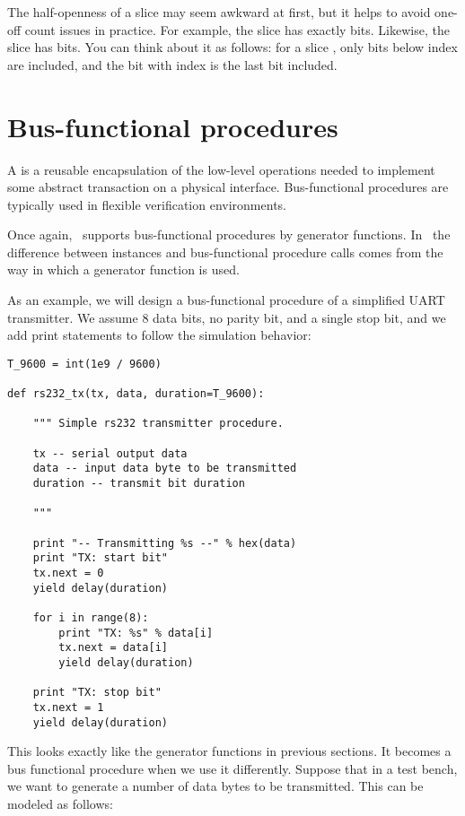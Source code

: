 The half-openness of a slice may seem awkward at first, but it helps
to avoid one-off count issues in practice. For example, the slice
 has exactly  bits. Likewise, the slice
 has  bits. You can think about it as
follows: for a slice \code{[i:j]}, only bits below index  are
included, and the bit with index  is the last bit included.


\section{Bus-functional procedures}

A  is a reusable encapsulation of the
low-level operations needed to implement some abstract transaction on
a physical interface. Bus-functional procedures are typically used in
flexible verification environments.

Once again, \myhdl\ supports bus-functional procedures by generator
functions. In \myhdl\, the difference between instances and
bus-functional procedure calls comes from the way in which a generator
function is used.

As an example, we will design a bus-functional procedure of a
simplified UART transmitter. We assume 8 data bits, no parity bit, and
a single stop bit, and we add print statements to follow the
simulation behavior:

\begin{verbatim}
T_9600 = int(1e9 / 9600)

def rs232_tx(tx, data, duration=T_9600):
    
    """ Simple rs232 transmitter procedure.

    tx -- serial output data
    data -- input data byte to be transmitted
    duration -- transmit bit duration
    
    """

    print "-- Transmitting %s --" % hex(data)
    print "TX: start bit"      
    tx.next = 0
    yield delay(duration)

    for i in range(8):
        print "TX: %s" % data[i]
        tx.next = data[i]
        yield delay(duration)

    print "TX: stop bit"      
    tx.next = 1
    yield delay(duration)
\end{verbatim}

This looks exactly like the generator functions in previous sections. It
becomes a bus functional procedure when we use it differently. Suppose
that in a test bench, we want to generate a number of data bytes to be
transmitted. This can be modeled as follows:


